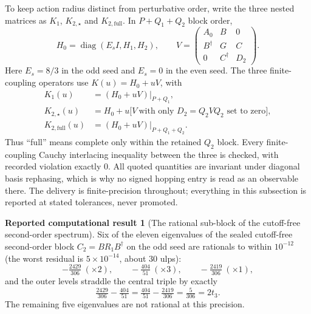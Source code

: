 \documentclass[11pt]{article}
\theoremstyle{plain}
\theoremstyle{definition}
\newtheorem{reported}[theorem]{Reported computational result}
\theoremstyle{remark}
\newcommand{\dg}{^{\dagger}}
\begin{document}
To keep action radius distinct from perturbative order, write the three nested
matrices as $K_1$, $K_{2,\star}$ and $K_{2,\mathrm{full}}$. In
$P+Q_1+Q_2$ block order,
\begin{equation}\label{eq:r2blocks}
  H_0=\operatorname{diag}(E_sI,H_1,H_2),\qquad
  V=\begin{pmatrix}A_0&B&0\\ B\dg&G&C\\ 0&C\dg&D_2\end{pmatrix}.
\end{equation}
Here $E_s=8/3$ in the odd seed and $E_s=0$ in the even seed. The three
finite-coupling operators use $K(u)=H_0+uV$, with
\begin{equation}\label{eq:r2nested}
  \begin{aligned}
    K_1(u)&=(H_0+uV)|_{P+Q_1},\\
    K_{2,\star}(u)&=H_0+u\bigl[V\ \text{with only }D_2=Q_2VQ_2\text{ set to zero}\bigr],\\
    K_{2,\mathrm{full}}(u)&=(H_0+uV)|_{P+Q_1+Q_2}.
  \end{aligned}
\end{equation}
Thus ``full'' means complete only within the retained $Q_2$ block. Every
finite-coupling Cauchy interlacing inequality between the three is checked,
with recorded violation exactly $0$. All quoted quantities are invariant under
diagonal basis rephasing, which is why no signed hopping entry is read as an
observable there. The delivery is finite-precision throughout; everything in
this subsection is reported at stated tolerances, never promoted.

\begin{reported}[The rational sub-block of the cutoff-free second-order
spectrum]\label{rep:radius2}
Six of the eleven eigenvalues of the sealed cutoff-free second-order block
$C_2=BR_1B\dg$ on the odd seed are rationals to within $10^{-12}$
(the worst residual is $5\times10^{-14}$, about $30$ ulps):
\[
  -\tfrac{2429}{306}\ (\times2),\qquad
  -\tfrac{404}{51}\ (\times3),\qquad
  -\tfrac{2419}{306}\ (\times1),
\]
and the outer levels straddle the central triple by exactly
\[
  \tfrac{2429}{306}-\tfrac{404}{51}
  =\tfrac{404}{51}-\tfrac{2419}{306}
  =\tfrac{5}{306}=2t_3 .
\]
The remaining five eigenvalues are not rational at this precision.
\end{reported}
\end{document}

